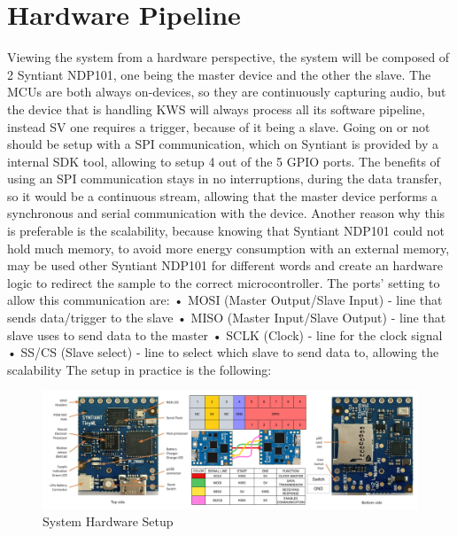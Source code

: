 \section{Hardware Pipeline}
\label{sec:hw pipeline}
Viewing the system from a hardware perspective, the system will be composed of 2 Syntiant NDP101, one being the master device and the other the slave. The MCUs are both always on-devices, so they are continuously capturing audio, but the device that is handling KWS will always process all its software pipeline, instead SV one requires a trigger, because of it being a slave. Going on or not should be setup with a SPI communication, which on Syntiant is provided by a internal SDK tool, allowing to setup 4 out of the 5 GPIO ports. The benefits of using an SPI communication stays in no interruptions, during the data transfer, so it would be a continuous stream, allowing that the master device performs a synchronous and serial communication with the device. Another reason why this is preferable is the scalability, because knowing that Syntiant NDP101 could not hold much memory, to avoid more energy consumption with an external memory, may be used other Syntiant NDP101 for different words and create an hardware logic to redirect the sample to the correct microcontroller. The ports' setting to allow this communication are:\newline
• MOSI (Master Output/Slave Input) - line that sends data/trigger to the slave\newline
• MISO (Master Input/Slave Output) - line that slave uses to send data to the master\newline
• SCLK (Clock) - line for the clock signal\newline 
• SS/CS (Slave select) - line to select which slave to send data to, allowing the scalability\newline
The setup in practice is the following:\newline
\begin{center}
    \centering
    \begin{figure}[!h]
        \includegraphics[width=1.0\textwidth]{images/4.05 Hardware Pipeline 2 NDP101.png}
        \caption{System Hardware Setup}
    \end{figure}
\end{center}
